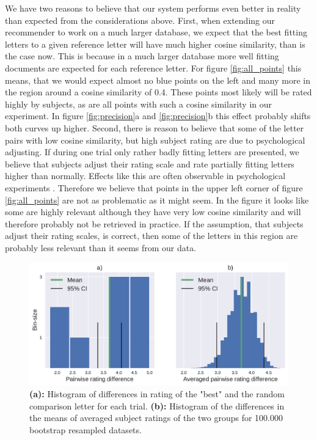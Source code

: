 We have two reasons to believe that our system performs even better in reality than expected from the considerations above. First, when extending our recommender to work on a much larger database, we expect that the best fitting letters to a given reference letter will have much higher cosine similarity, than is the case now. This is because in a much larger database more well fitting documents are expected for each reference letter. For figure \ref{fig:all_points} this means, that we would expect almost no blue points on the left and many more in the region around a cosine similarity of 0.4. These points most likely will be rated highly by subjects, as are all points with such a cosine similarity in our experiment. In figure \ref{fig:precision}a and \ref{fig:precision}b this effect probably shifts both curves up higher. Second, there is reason to believe that some of the letter pairs with low cosine similarity, but high subject rating are due to psychological adjusting. If during one trial only rather badly fitting letters are presented, we believe that subjects adjust their rating scale and rate partially fitting letters higher than normally. Effects like this are often observable in psychological experiments \citep{Poulton1975}. Therefore we believe that points in the upper left corner of figure \ref{fig:all_points} are not as problematic as it might seem. In the figure it looks like some are highly relevant although they have very low cosine similarity and will therefore probably not be retrieved in practice. If the assumption, that subjects adjust their rating scales, is correct, then some of the letters in this region are probably less relevant than it seems from our data.

\begin{figure}
	\includegraphics[width=\textwidth]{figures/both_diff_pv}
	
	\caption{\textbf{(a):} Histogram of differences in rating of the "best" and the random comparison letter for each trial.
		\textbf{(b):} Histogram of the differences in the means of averaged subject ratings of the two groups for 100.000 bootstrap resampled datasets.}
	\label{fig:both_diff_pv}
\end{figure}

